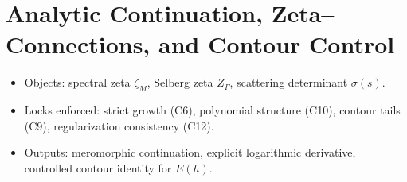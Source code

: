 
\section{Analytic Continuation, Zeta–Connections, and Contour Control} \label{sec:analytic-zeta} \relax \hspace{0pt} %

\begin{tcolorbox}[colback=gray!4,colframe=gray!60,title={Scope \& Locks (Part~4/5)}] %
\begin{itemize}
  \item Objects: spectral zeta \(\zeta_M\), Selberg zeta \(Z_\Gamma\), scattering determinant \(\sigma(s)\). %
  \item Locks enforced: strict growth (C6), polynomial structure (C10), contour tails (C9), regularization consistency (C12). %
  \item Outputs: meromorphic continuation, explicit logarithmic derivative, controlled contour identity for \(E(h)\). %
\end{itemize}
\end{tcolorbox}

